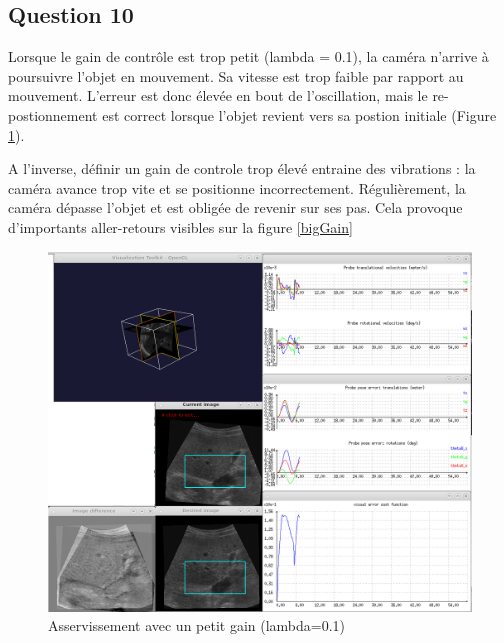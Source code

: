 \documentclass[a4paper,11pt]{article}
\begin{document}
\subsection{Question 10}
Lorsque le gain de contr\^ole est trop petit (lambda = 0.1), la cam\'era n'arrive \`a poursuivre l'objet en mouvement. Sa vitesse est trop faible par rapport au mouvement. L'erreur est donc \'elev\'ee en bout de l'oscillation, mais le re-postionnement est correct lorsque l'objet revient vers sa postion initiale (Figure \ref{smallGain}).
\par
A l'inverse, d\'efinir un gain de controle trop \'elev\'e entraine des vibrations : la cam\'era avance trop vite et se positionne incorrectement. R\'eguli\`erement, la cam\'era d\'epasse l'objet et est oblig\'ee de revenir sur ses pas. Cela provoque d'importants aller-retours visibles sur la figure \ref{bigGain}
\begin{figure}[H]
    \centering
    \includegraphics[width=0.5\textheight]{./images/q10_small.png}
    \caption{Asservissement avec un petit gain (lambda=0.1)}
    \label{smallGain}
\end{figure}
\end{document}

